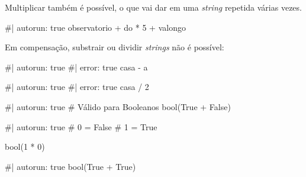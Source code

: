 \documentclass[
  letterpaper,
  DIV=11,
  numbers=noendperiod]{scrreprt}
\newenvironment{Shaded}{\begin{snugshade}}{\end{snugshade}}
\newcommand{\NormalTok}[1]{\textcolor[rgb]{0.00,0.23,0.31}{#1}}
\begin{document}
Multiplicar também é possível, o que vai dar em uma \emph{string}
repetida várias vezes.

\begin{Shaded}
\begin{Highlighting}[]
\NormalTok{\#| autorun: true}
\NormalTok{\textquotesingle{}observatorio\textquotesingle{} + \textquotesingle{} do \textquotesingle{} * 5 + \textquotesingle{}valongo\textquotesingle{}}
\end{Highlighting}
\end{Shaded}

Em compensação, substrair ou dividir \emph{strings} não é possível:

\begin{Shaded}
\begin{Highlighting}[]
\NormalTok{\#| autorun: true}
\NormalTok{\#| error: true}
\NormalTok{\textquotesingle{}casa\textquotesingle{} {-} \textquotesingle{}a\textquotesingle{}}
\end{Highlighting}
\end{Shaded}

\begin{Shaded}
\begin{Highlighting}[]
\NormalTok{\#| autorun: true}
\NormalTok{\#| error: true}
\NormalTok{\textquotesingle{}casa\textquotesingle{} / 2}
\end{Highlighting}
\end{Shaded}

\begin{Shaded}
\begin{Highlighting}[]
\NormalTok{\#| autorun: true}
\NormalTok{\# Válido para Booleanos}
\NormalTok{bool(True + False)}
\end{Highlighting}
\end{Shaded}

\begin{Shaded}
\begin{Highlighting}[]
\NormalTok{\#| autorun: true}
\NormalTok{\# 0 = False}
\NormalTok{\# 1 = True}

\NormalTok{bool(1 * 0)}
\end{Highlighting}
\end{Shaded}

\begin{Shaded}
\begin{Highlighting}[]
\NormalTok{\#| autorun: true}
\NormalTok{bool(True + True)}
\end{Highlighting}
\end{Shaded}
\end{document}
